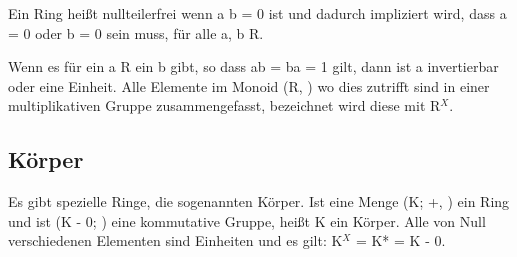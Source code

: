			Ein Ring heißt nullteilerfrei wenn a \mycdot b = 0 ist und dadurch impliziert wird, dass a = 0 oder b = 0 sein muss, für alle a, b \myin R.~\cite{Erste:Hilfe:in:Linearer:Algebra}
			
			Wenn es für ein a \myin R ein b gibt, so dass ab = ba = 1 gilt, dann ist a invertierbar oder eine Einheit. Alle Elemente im Monoid (R, \mycdot) wo dies zutrifft sind in einer multiplikativen Gruppe zusammengefasst, bezeichnet wird diese mit R$^X$.~\cite{Erste:Hilfe:in:Linearer:Algebra}
			
		
		\subsection{Körper}
			Es gibt spezielle Ringe, die sogenannten Körper. Ist eine Menge (K; +, \mycdot) ein Ring und ist (K - {0}; \mycdot) eine kommutative Gruppe, heißt K ein Körper. Alle von Null verschiedenen Elementen sind Einheiten und es gilt: K$^X$ = K* = K - {0}.~\cite{Erste:Hilfe:in:Linearer:Algebra}
			
			